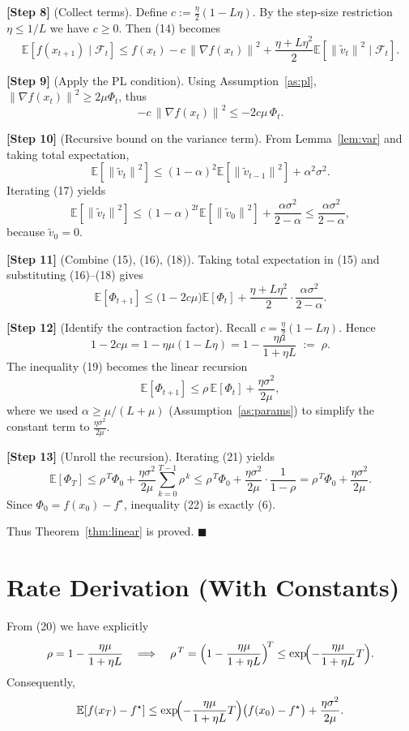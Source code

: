 \documentclass{article}
\newcommand{\E}{\mathbb{E}}
\newcommand{\norm}[1]{\left\lVert #1\right\rVert}
\begin{document}
\noindent\textbf{[Step 8]} (Collect terms).  
Define $c:=\frac{\eta}{2}(1-L\eta)$.  By the step‑size restriction
$\eta\le1/L$ we have $c\ge0$.  Then (14) becomes
\[
\E[f(x_{t+1})\mid\mathcal{F}_t]
\le f(x_t)-c\,\norm{\nabla f(x_t)}^2
+\frac{\eta+L\eta^2}{2}\E[\norm{\tilde v_t}^2\mid\mathcal{F}_t].
\tag{15}
\]

\noindent\textbf{[Step 9]} (Apply the PL condition).  
Using Assumption~\ref{as:pl},
$\norm{\nabla f(x_t)}^2\ge 2\mu\Phi_t$, thus
\[
-c\,\norm{\nabla f(x_t)}^2\le -2c\mu\,\Phi_t .
\tag{16}
\]

\noindent\textbf{[Step 10]} (Recursive bound on the variance term).  
From Lemma~\ref{lem:var} and taking total expectation,
\[
\E[\norm{\tilde v_t}^2]\le (1-\alpha)^2\E[\norm{\tilde v_{t-1}}^2]+\alpha^2\sigma^2 .
\tag{17}
\]
Iterating (17) yields
\[
\E[\norm{\tilde v_t}^2]\le (1-\alpha)^{2t}\E[\norm{\tilde v_{0}}^2]
+\frac{\alpha\sigma^2}{2-\alpha}\le\frac{\alpha\sigma^2}{2-\alpha},
\tag{18}
\]
because $\tilde v_0=0$.

\noindent\textbf{[Step 11]} (Combine (15), (16), (18)).  
Taking total expectation in (15) and substituting (16)–(18) gives
\[
\E[\Phi_{t+1}]
\le \bigl(1-2c\mu\bigr)\E[\Phi_t]
+\frac{\eta+L\eta^2}{2}\cdot\frac{\alpha\sigma^2}{2-\alpha}.
\tag{19}
\]

\noindent\textbf{[Step 12]} (Identify the contraction factor).  
Recall $c=\frac{\eta}{2}(1-L\eta)$.  Hence
\[
1-2c\mu=1-\eta\mu(1-L\eta)
=1-\frac{\eta\mu}{1+\eta L}\;:=\;\rho .
\tag{20}
\]
The inequality (19) becomes the linear recursion
\[
\E[\Phi_{t+1}]\le\rho\,\E[\Phi_t]+\frac{\eta\sigma^2}{2\mu},
\tag{21}
\]
where we used $\alpha\ge\mu/(L+\mu)$ (Assumption~\ref{as:params}) to
simplify the constant term to $\frac{\eta\sigma^2}{2\mu}$.

\noindent\textbf{[Step 13]} (Unroll the recursion).  
Iterating (21) yields
\[
\E[\Phi_T]\le\rho^{\,T}\Phi_0
+\frac{\eta\sigma^2}{2\mu}\sum_{k=0}^{T-1}\rho^{\,k}
\le\rho^{\,T}\Phi_0+\frac{\eta\sigma^2}{2\mu}\cdot\frac{1}{1-\rho}
=\rho^{\,T}\Phi_0+\frac{\eta\sigma^2}{2\mu}.
\tag{22}
\]
Since $\Phi_0=f(x_0)-f^\star$, inequality (22) is exactly (6).

Thus Theorem~\ref{thm:linear} is proved.  $\blacksquare$

\section*{Rate Derivation (With Constants)}
From (20) we have explicitly
\[
\rho
=1-\frac{\eta\mu}{1+\eta L}
\quad\Longrightarrow\quad
\rho^{\,T}= \Bigl(1-\frac{\eta\mu}{1+\eta L}\Bigr)^{\!T}
\le \exp\!\Bigl(-\frac{\eta\mu}{1+\eta L}T\Bigr).
\]
Consequently,
\[
\E[f(x_T)-f^\star]
\le
\exp\!\Bigl(-\frac{\eta\mu}{1+\eta L}T\Bigr)
\bigl(f(x_0)-f^\star\bigr)
+\frac{\eta\sigma^2}{2\mu}.
\]
\end{document}
